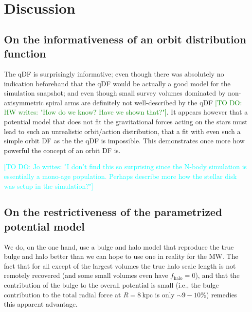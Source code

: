 \documentclass[iop,revtex4,numberedappendix,appendixfloats]{emulateapj}
\newcommand{\HW}[1]{\textcolor{Green}{#1}}
\newcommand{\Jo}[1]{\textcolor{Cyan}{#1}}
\begin{document}
\section{Discussion} \label{sec:discussion}

\subsection{On the informativeness of an orbit distribution function}

The qDF is surprisingly informative; even though there was absolutely no indication beforehand that the qDF would be actually a good model for the simulation snapshot; and even though small survey volumes dominated by non-axisymmetric spiral arms are definitely not well-described by the qDF \HW{[TO DO: HW writes: "How do we know? Have we shown that?"]}. It appears however that a potential model that does not fit the gravitational forces acting on the stars must lead to such an unrealistic orbit/action distribution, that a fit with even such a simple orbit DF as the the qDF is impossible. This demonstrates once more how powerful the concept of an orbit DF is.

\Jo{[TO DO: Jo writes: "I don't find this so surprising since the N-body simulation is essentially a mono-age population. Perhaps describe more how the stellar disk was setup in the simulation?"]}

\subsection{On the restrictiveness of the parametrized potential model}

We do, on the one hand, use a bulge and halo model that reproduce the true bulge and halo better than we can hope to use one in reality for the MW. The fact that for all except of the largest volumes the true halo scale length is not remotely recovered (and some small volumes even have $f_\text{halo}=0$), and that the contribution of the bulge to the overall potential is small (i.e., the bulge contribution to the total radial force at $R=8~\text{kpc}$ is only $\sim 9-10\%$) remedies this apparent advantage. 
\end{document}

